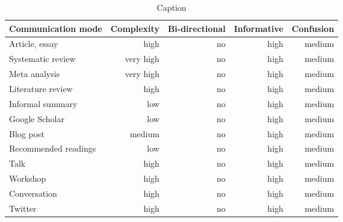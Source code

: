 \begin{table*}\centering
{}
\begin{tabular}{@{}lrrrr@{}}\toprule
Communication mode & Complexity & Bi-directional & Informative  & Confusion
\\\midrule
Article, essay      & high & no & high & medium  \\
Systematic review   & very high & no & high & medium\\
Meta analysis       & very high & no & high & medium\\
Literature review   & high & no & high & medium\\
Informal summary    & low & no & high & medium\\
Google Scholar      & low & no & high & medium\\
Blog post           & medium & no & high & medium\\
Recommended readings& low & no & high & medium\\
Talk                & high & no & high & medium\\
Workshop            & high & no & high & medium\\
Conversation        & high & no & high & medium\\
Twitter             & high & no & high & medium\\
\bottomrule
\end{tabular}
\caption{Caption}
\end{table*}